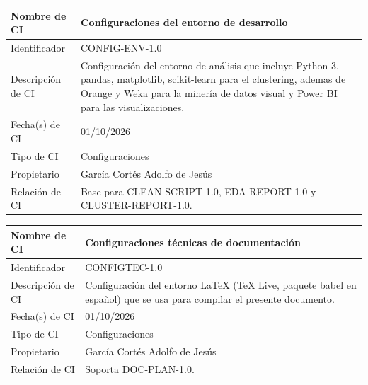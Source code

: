 \documentclass[letterpaper,11pt]{article}
\begin{document}
\noindent\begin{minipage}{\textwidth}
\small\renewcommand{\arraystretch}{1.9}
\begin{tabularx}{\textwidth}{|p{3.3cm}|Y|}
\hline
Nombre de CI & Configuraciones del entorno de desarrollo \\ \hline
Identificador & CONFIG-ENV-1.0 \\ \hline
Descripción de CI & Configuración del entorno de análisis que incluye Python 3, pandas, matplotlib, scikit-learn para el clustering, ademas de Orange y Weka para la minería de datos visual y Power BI para las visualizaciones. \\ \hline
Fecha(s) de CI & 01/10/2026 \\ \hline
Tipo de CI & Configuraciones \\ \hline
Propietario & García Cortés Adolfo de Jesús \\ \hline
Relación de CI & Base para CLEAN-SCRIPT-1.0, EDA-REPORT-1.0 y CLUSTER-REPORT-1.0. \\ \hline
\end{tabularx}
\end{minipage}\par\bigskip
\noindent\begin{minipage}{\textwidth}
\small\renewcommand{\arraystretch}{1.9}
\begin{tabularx}{\textwidth}{|p{3.3cm}|Y|}
\hline
Nombre de CI & Configuraciones técnicas de documentación \\ \hline
Identificador & CONFIGTEC-1.0 \\ \hline
Descripción de CI & Configuración del entorno LaTeX (TeX Live, paquete babel en español) que se usa para compilar el presente documento. \\ \hline
Fecha(s) de CI & 01/10/2026 \\ \hline
Tipo de CI & Configuraciones \\ \hline
Propietario & García Cortés Adolfo de Jesús \\ \hline
Relación de CI & Soporta DOC-PLAN-1.0. \\ \hline
\end{tabularx}
\end{minipage}\par\bigskip
\end{document}
